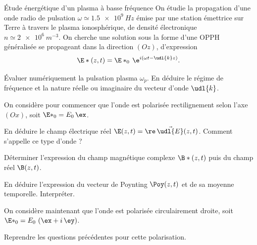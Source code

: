 \begin{exo}[PC][1][TD]{Étude énergétique d'un plasma à basse fréquence}
  On étudie la propagation d'une onde radio de pulsation $\omega \simeq \SI{1.5e9}{Hz}$ émise par une station émettrice sur Terre à travers le plasma ionosphérique, de densité électronique $n \simeq \SI{2e6}{m^{-3}}$.  On cherche une solution sous la forme d'une OPPH généralisée se propageant dans la direction $(Oz)$, d'expression 
  \begin{equation}
    \E*(z,t) = \E*_0 \,\e^{i(\omega t - \udl{k} z)}.
  \end{equation}
  \begin{quest}
    \item	Évaluer numériquement la pulsation plasma $\omega_p$. En déduire le régime de fréquence et la nature réelle ou imaginaire du vecteur d'onde $\udl{k}$.
  \end{quest}

  On considère pour commencer que l'onde est polarisée rectilignement selon l'axe $(Ox)$, soit $\E*_0 = E_0 \,\ex$.
  \begin{quest}
    \item	En déduire le champ électrique réel $\E(z,t) = \re\,\Vec{\udl{E}}(z,t)$. Comment s'appelle ce type d'onde ?
    \item Déterminer l'expression du champ magnétique complexe $\B*(z,t)$ puis du champ réel $\B(z,t)$.
    \item En déduire l'expression du vecteur de Poynting $\Poy(z,t)$ et de sa moyenne temporelle. Interpréter.
  \end{quest}
  On considère maintenant que l'onde est polarisée circulairement droite, soit $\E*_0 = E_0 \,\left(\ex + i\,\ey\right)$.
  \begin{quest}
    \item	Reprendre les questions précédentes pour cette polarisation.
  \end{quest}
\end{exo}


